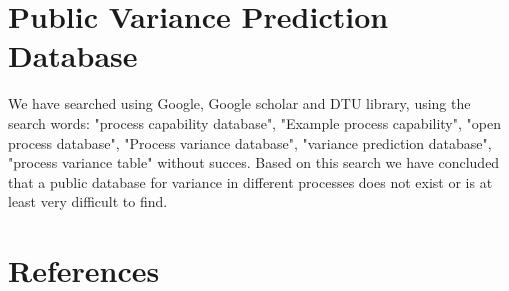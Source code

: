 \documentclass[aip,amsmath,reprint, author-year]{revtex4-1}
\begin{document}
\section{Public Variance Prediction Database}

We have searched using Google, Google scholar and DTU library, using the search words: "process capability database", "Example process capability", "open process database", "Process variance database", "variance prediction database", "process variance table" without succes. 
Based on this search we have concluded that a public database for variance in different processes does not exist or is at least very difficult to find.

\section*{References}

\end{document}
